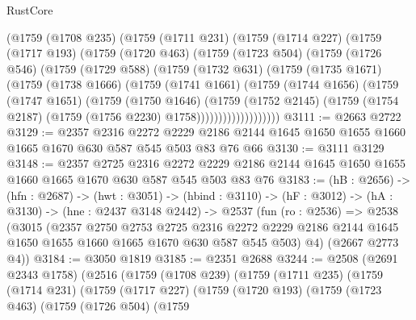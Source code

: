 \begin{lexlean}{RustCore}
\begin{coremodule}
      (@1759
        (@1708 @235)
        (@1759
          (@1711 @231)
          (@1759
            (@1714 @227)
            (@1759
              (@1717 @193)
              (@1759
                (@1720 @463)
                (@1759
                  (@1723 @504)
                  (@1759
                    (@1726 @546)
                    (@1759
                      (@1729 @588)
                      (@1759
                        (@1732 @631)
                        (@1759
                          (@1735 @1671)
                          (@1759
                            (@1738 @1666)
                            (@1759
                              (@1741 @1661)
                              (@1759
                                (@1744 @1656)
                                (@1759
                                  (@1747 @1651)
                                  (@1759
                                    (@1750 @1646)
                                    (@1759
                                      (@1752 @2145)
                                      (@1759
                                        (@1754 @2187)
                                        (@1759 (@1756 @2230) @1758)))))))))))))))))))
@3111 := @2663 @2722
@3129 := @2357
    @2316
    @2272
    @2229
    @2186
    @2144
    @1645
    @1650
    @1655
    @1660
    @1665
    @1670
    @630
    @587
    @545
    @503
    @83
    @76
    @66
@3130 := @3111 @3129
@3148 := @2357
    @2725
    @2316
    @2272
    @2229
    @2186
    @2144
    @1645
    @1650
    @1655
    @1660
    @1665
    @1670
    @630
    @587
    @545
    @503
    @83
    @76
@3183 := (hB : @2656) ->
  (hfn : @2687) ->
  (hwt : @3051) ->
  (hbind : @3110) ->
  (hF : @3012) ->
  (hA : @3130) ->
  (hne : @2437 @3148 @2442) ->
  @2537
    (fun (ro : @2536) =>
    @2538
      (@3015
        (@2357
          @2750
          @2753
          @2725
          @2316
          @2272
          @2229
          @2186
          @2144
          @1645
          @1650
          @1655
          @1660
          @1665
          @1670
          @630
          @587
          @545
          @503)
        @4)
      (@2667 @2773 @4))
@3184 := @3050 @1819
@3185 := @2351 @2688
@3244 := @2508
    (@2691 @2343 @1758)
    (@2516
      (@1759
        (@1708 @239)
        (@1759
          (@1711 @235)
          (@1759
            (@1714 @231)
            (@1759
              (@1717 @227)
              (@1759
                (@1720 @193)
                (@1759
                  (@1723 @463)
                  (@1759
                    (@1726 @504)
                    (@1759

\end{coremodule}
\end{lexlean}
